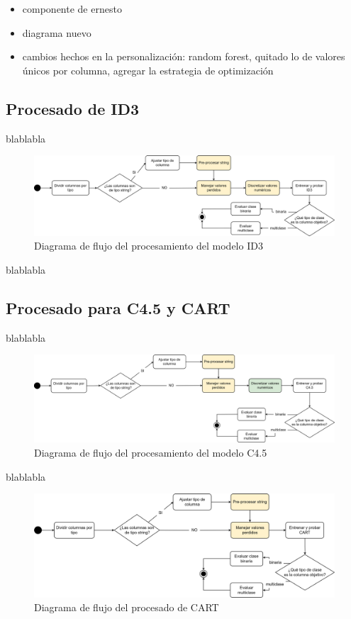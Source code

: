 \begin{itemize}
	\item componente de ernesto
	\item diagrama nuevo
	\item cambios hechos en la personalización: random forest, quitado lo de valores únicos por columna, agregar la estrategia de optimización
\end{itemize}

\subsection{Procesado de ID3}
blablabla


\begin{figure}[H]
	\centering
	\includegraphics[width=1\linewidth]{"figuras/capi 2/modelos/procesado id3.drawio"}
	\caption{Diagrama de flujo del procesamiento del modelo ID3}
	\label{fig:procesado-id3}
\end{figure}

blablabla 



\subsection{Procesado para C4.5 y CART}
blablabla

\begin{figure}[H]
	\centering
	\includegraphics[width=1\linewidth]{"figuras/capi 2/modelos/procesado c4pt5.drawio"}
	\caption{Diagrama de flujo del procesamiento del modelo C4.5}
	\label{fig:procesado-c4pt5}
\end{figure}

blablabla

\begin{figure}[H]
	\centering
	\includegraphics[width=1\linewidth]{"figuras/capi 2/modelos/procesado cart.drawio"}
	\caption{Diagrama de flujo del procesado de CART}
	\label{fig:procesado-cart}
\end{figure}

